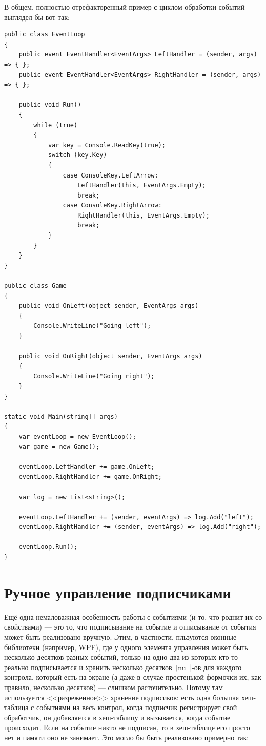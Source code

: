 \documentclass[a5paper]{article}
\begin{document}
В общем, полностью отрефакторенный пример с циклом обработки событий выглядел бы вот так:

\begin{verbatim}
public class EventLoop
{
    public event EventHandler<EventArgs> LeftHandler = (sender, args) => { };
    public event EventHandler<EventArgs> RightHandler = (sender, args) => { };

    public void Run()
    {
        while (true)
        {
            var key = Console.ReadKey(true);
            switch (key.Key)
            {
                case ConsoleKey.LeftArrow:
                    LeftHandler(this, EventArgs.Empty);
                    break;
                case ConsoleKey.RightArrow:
                    RightHandler(this, EventArgs.Empty);
                    break;
            }
        }
    }
}

public class Game
{
    public void OnLeft(object sender, EventArgs args)
    {
        Console.WriteLine("Going left");
    }

    public void OnRight(object sender, EventArgs args)
    {
        Console.WriteLine("Going right");
    }
}

static void Main(string[] args)
{
    var eventLoop = new EventLoop();
    var game = new Game();

    eventLoop.LeftHandler += game.OnLeft;
    eventLoop.RightHandler += game.OnRight;

    var log = new List<string>();

    eventLoop.LeftHandler += (sender, eventArgs) => log.Add("left");
    eventLoop.RightHandler += (sender, eventArgs) => log.Add("right");

    eventLoop.Run();
}
\end{verbatim}

\section{Ручное управление подписчиками}

Ещё одна немаловажная особенность работы с событиями (и то, что роднит их со свойствами) --- это то, что подписывание на событие и отписывание от события может быть реализовано вручную. Этим, в частности, пльзуются оконные библиотеки (например, WPF), где у одного элемента управления может быть несколько десятков разных событий, только на одно-два из которых кто-то реально подписывается и хранить несколько десятков \texttt|null|-ов для каждого контрола, который есть на экране (а даже в случае простенькой формочки их, как правило, несколько десятков) --- слишком расточительно. Потому там используется <<разреженное>> хранение подписиков: есть одна большая хеш-таблица с событиями на весь контрол, когда подписчик регистрирует свой обработчик, он добавляется в хеш-таблицу и вызывается, когда событие происходит. Если на событие никто не подписан, то в хеш-таблице его просто нет и памяти оно не занимает. Это могло бы быть реализовано примерно так:
\end{document}
